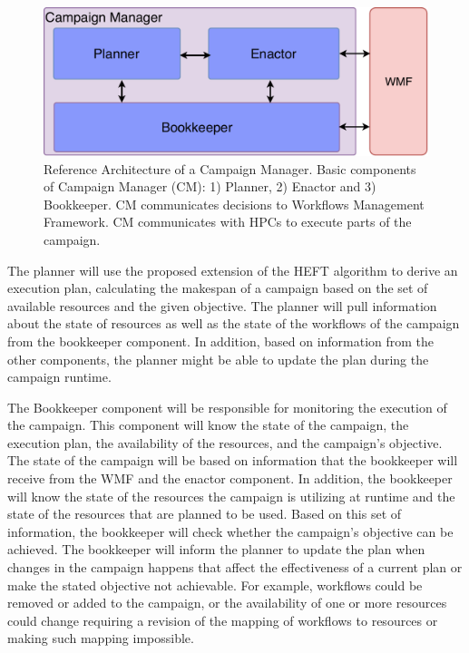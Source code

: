\begin{figure}[t]
    \centering
    \includegraphics[width=.95\textwidth]{figures/CEM_design.pdf}
    \caption{Reference Architecture of a Campaign Manager. Basic 
    components of Campaign Manager (CM): 1) Planner, 2) Enactor and 3) Bookkeeper. 
    CM communicates decisions to Workflows Management Framework. CM communicates with HPCs to 
    execute parts of the campaign.}\label{fig:refarch}
\end{figure}

The planner will use the proposed extension of the HEFT algorithm to derive an execution plan, calculating the makespan of a campaign based on the set of available resources and the given objective. 
The planner will pull information about the state of resources as well as the state of the workflows of the campaign from the bookkeeper component.
In addition, based on information from the other components, the planner might be able to update the plan during the campaign runtime. 


The Bookkeeper component will be responsible for monitoring the execution of the campaign.
This component will know the state of the campaign, the execution plan, the availability of the resources, and the campaign's objective.
The state of the campaign will be based on information that the bookkeeper will receive from the WMF and the enactor component.
In addition, the bookkeeper will know the state of the resources the campaign is utilizing at runtime and the state of the resources that are planned to be used.
Based on this set of information, the bookkeeper will check whether the campaign's objective can be achieved.
The bookkeeper will inform the planner to update the plan when changes in the campaign happens that affect the effectiveness of a current plan or make the stated objective not achievable. 
For example, workflows could be removed or added to the campaign, or the availability of one or more resources could change requiring a revision of the mapping of workflows to resources or making such mapping impossible.

